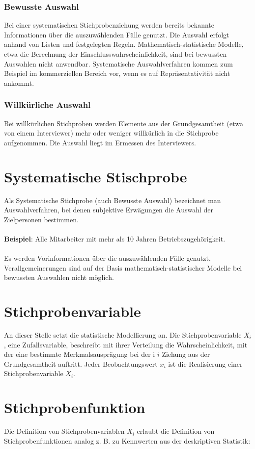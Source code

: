 \subsubsection{Bewusste Auswahl}
Bei einer systematischen Stichprobenziehung werden bereits bekannte Informationen über die auszuwählenden Fälle genutzt. Die Auswahl erfolgt anhand von Listen und festgelegten Regeln. Mathematisch-statistische Modelle, etwa die Berechnung der Einschlusswahrscheinlichkeit, sind bei bewussten Auswahlen nicht anwendbar. Systematische Auswahlverfahren kommen zum Beispiel im kommerziellen Bereich vor, wenn es auf Repräsentativität nicht ankommt.
\subsubsection{Willkürliche Auswahl}
Bei willkürlichen Stichproben werden Elemente aus der Grundgesamtheit (etwa von einem Interviewer) mehr oder weniger willkürlich in die Stichprobe aufgenommen. Die Auswahl liegt im Ermessen des Interviewers.

\section{Systematische Stischprobe}
Als Systematische Stichprobe (auch Bewusste Auswahl) bezeichnet man Auswahlverfahren, bei denen subjektive Erwägungen die Auswahl der Zielpersonen bestimmen.\\
\\
\textbf{Beispiel}: Alle Mitarbeiter mit mehr als 10 Jahren Betriebszugehörigkeit.\\
\\
Es werden Vorinformationen über die auszuwählenden Fälle genutzt. Verallgemeinerungen sind auf der Basis mathematisch-statistischer Modelle bei bewussten Auswahlen nicht möglich.

\section{Stichprobenvariable}
An dieser Stelle setzt die statistische Modellierung an. Die Stichprobenvariable ${\displaystyle X_{i}}$, eine Zufallsvariable, beschreibt mit ihrer Verteilung die Wahrscheinlichkeit, mit der eine bestimmte Merkmalsausprägung bei der i ${\displaystyle i}$ Ziehung aus der Grundgesamtheit auftritt. Jeder Beobachtungswert ${\displaystyle x_{i}}$ ist die Realisierung einer Stichprobenvariable ${\displaystyle X_{i}}$.

\section{Stichprobenfunktion}
Die Definition von Stichprobenvariablen ${\displaystyle X_{i}}$ erlaubt die Definition von Stichprobenfunktionen analog z. B. zu Kennwerten aus der deskriptiven Statistik:
